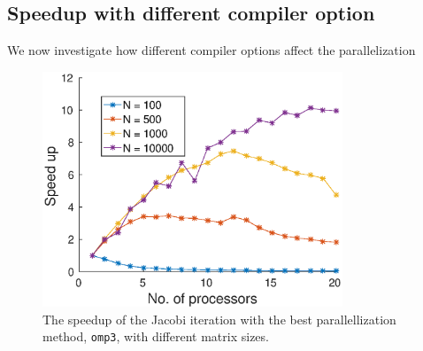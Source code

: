 \subsection{Speedup with different compiler option}
We now investigate how different compiler options affect the parallelization
\begin{figure}
\centering
\includegraphics[width = 0.8\textwidth]{fig/speedup_N.eps}
\caption{The speedup of the Jacobi iteration with the best parallellization method, \texttt{omp3}, with different matrix sizes.}
\label{fig:speedup_N}
\end{figure}
